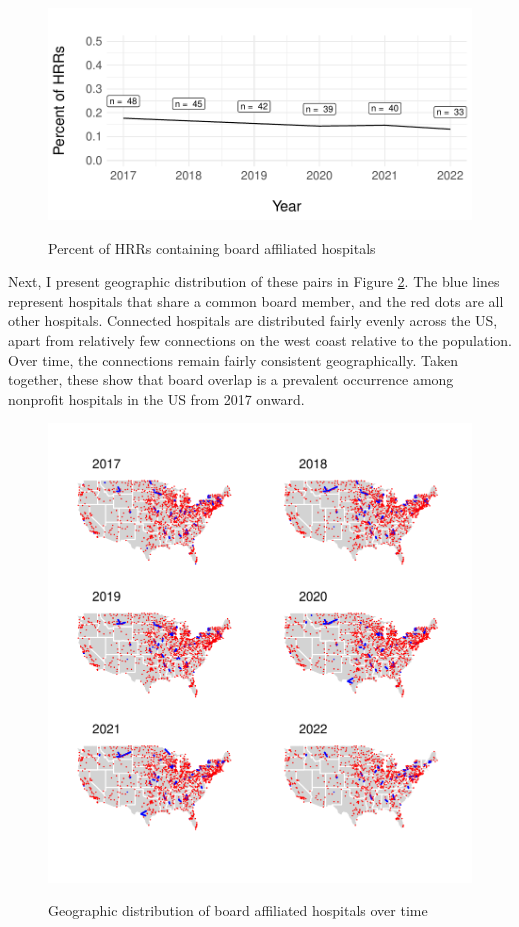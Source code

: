 \documentclass[12pt]{article}
\begin{document}
    \begin{figure}[ht!]
        \centering
        \caption{Percent of HRRs containing board affiliated hospitals}
        \includegraphics[width=.8\textwidth]{Objects/connected_HRR_percent.pdf}
        \label{fig:connected_HRR_percent}
    \end{figure}

    Next, I present geographic distribution of these pairs in Figure \ref{fig:connected_maps}. The blue lines represent hospitals that share a common board member, and the red dots are all other hospitals. Connected hospitals are distributed fairly evenly across the US, apart from relatively few connections on the west coast relative to the population. Over time, the connections remain fairly consistent geographically. Taken together, these show that board overlap is a prevalent occurrence among nonprofit hospitals in the US from 2017 onward. 

    \begin{figure}[ht!]
        \centering
        \caption{Geographic distribution of board affiliated hospitals over time}
        \includegraphics[width=\textwidth]{Objects/connected_maps.pdf}
        \label{fig:connected_maps}
    \end{figure}
\end{document}
